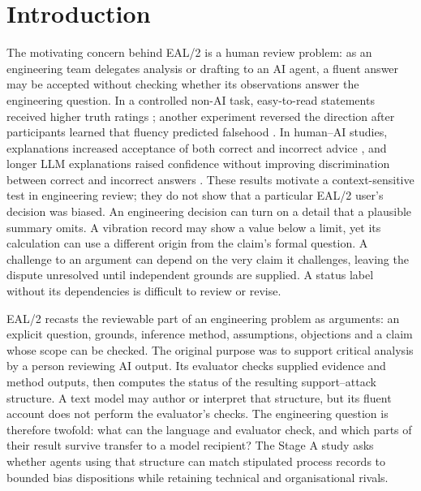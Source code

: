 \documentclass[preprint,12pt]{elsarticle}
\begin{document}
\section{Introduction}\label{sec:introduction}
The motivating concern behind EAL/2 is a human review problem: as an engineering team delegates analysis or drafting to an AI agent, a fluent answer may be accepted without checking whether its observations answer the engineering question. In a controlled non-AI task, easy-to-read statements received higher truth ratings \citep{reber1999}; another experiment reversed the direction after participants learned that fluency predicted falsehood \citep{unkelbach2007}. In human--AI studies, explanations increased acceptance of both correct and incorrect advice \citep{bansal2021}, and longer LLM explanations raised confidence without improving discrimination between correct and incorrect answers \citep{steyvers2025}. These results motivate a context-sensitive test in engineering review; they do not show that a particular EAL/2 user's decision was biased. An engineering decision can turn on a detail that a plausible summary omits. A vibration record may show a value below a limit, yet its calculation can use a different origin from the claim's formal question. A challenge to an argument can depend on the very claim it challenges, leaving the dispute unresolved until independent grounds are supplied. A status label without its dependencies is difficult to review or revise.

EAL/2 recasts the reviewable part of an engineering problem as arguments: an explicit question, grounds, inference method, assumptions, objections and a claim whose scope can be checked. The original purpose was to support critical analysis by a person reviewing AI output. Its evaluator checks supplied evidence and method outputs, then computes the status of the resulting support--attack structure. A text model may author or interpret that structure, but its fluent account does not perform the evaluator's checks. The engineering question is therefore twofold: what can the language and evaluator check, and which parts of their result survive transfer to a model recipient? The Stage A study asks whether agents using that structure can match stipulated process records to bounded bias dispositions while retaining technical and organisational rivals.
\end{document}
